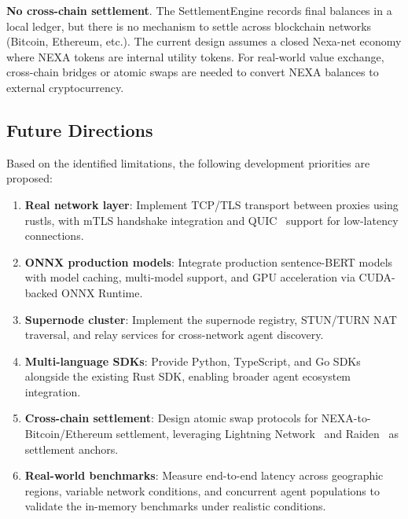 \textbf{No cross-chain settlement}. The SettlementEngine records final balances in a local ledger, but there is no mechanism to settle across blockchain networks (Bitcoin, Ethereum, etc.). The current design assumes a closed Nexa-net economy where NEXA tokens are internal utility tokens. For real-world value exchange, cross-chain bridges or atomic swaps are needed to convert NEXA balances to external cryptocurrency.

\subsection{Future Directions}

Based on the identified limitations, the following development priorities are proposed:

\begin{enumerate}
  \item \textbf{Real network layer}: Implement TCP/TLS transport between proxies using rustls, with mTLS handshake integration and QUIC~\cite{rfc9000} support for low-latency connections.
  \item \textbf{ONNX production models}: Integrate production sentence-BERT models with model caching, multi-model support, and GPU acceleration via CUDA-backed ONNX Runtime.
  \item \textbf{Supernode cluster}: Implement the supernode registry, STUN/TURN NAT traversal, and relay services for cross-network agent discovery.
  \item \textbf{Multi-language SDKs}: Provide Python, TypeScript, and Go SDKs alongside the existing Rust SDK, enabling broader agent ecosystem integration.
  \item \textbf{Cross-chain settlement}: Design atomic swap protocols for NEXA-to-Bitcoin/Ethereum settlement, leveraging Lightning Network~\cite{lightning2016} and Raiden~\cite{raiden2017} as settlement anchors.
  \item \textbf{Real-world benchmarks}: Measure end-to-end latency across geographic regions, variable network conditions, and concurrent agent populations to validate the in-memory benchmarks under realistic conditions.
\end{enumerate}
